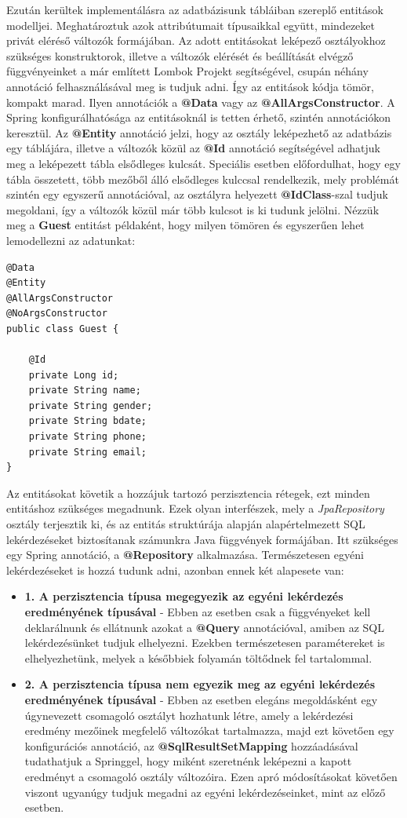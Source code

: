 \documentclass[12pt]{article}
\begin{document}
Ezután kerültek implementálásra az adatbázisunk tábláiban szereplő entitások modelljei. Meghatároztuk azok attribútumait típusaikkal együtt, mindezeket privát eléréső változók formájában. Az adott entitásokat leképező osztályokhoz szükséges konstruktorok, illetve a változók elérését és beállítását elvégző függvényeinket a már említett Lombok Projekt segítségével, csupán néhány annotáció felhasználásával meg is tudjuk adni. Így az entitások kódja tömör, kompakt marad. Ilyen annotációk a \textbf{@Data} vagy az \textbf{@AllArgsConstructor}. A Spring konfigurálhatósága az entitásoknál is tetten érhető, szintén annotációkon keresztül. Az \textbf{@Entity} annotáció jelzi, hogy az osztály leképezhető az adatbázis egy táblájára, illetve a változók közül az \textbf{@Id} annotáció segítségével adhatjuk meg a leképezett tábla elsődleges kulcsát. Speciális esetben előfordulhat, hogy egy tábla összetett, több mezőből álló elsődleges kulccsal rendelkezik, mely problémát szintén egy egyszerű annotációval, az osztályra helyezett \textbf{@IdClass}-szal tudjuk megoldani, így a változók közül már több kulcsot is ki tudunk jelölni. Nézzük meg a \textbf{Guest} entitást példaként, hogy milyen tömören és egyszerűen lehet lemodellezni az adatunkat:
\begin{verbatim}
@Data
@Entity
@AllArgsConstructor
@NoArgsConstructor
public class Guest {

    @Id
    private Long id;
    private String name;
    private String gender;
    private String bdate;
    private String phone;
    private String email;
}
\end{verbatim}

Az entitásokat követik a hozzájuk tartozó perzisztencia rétegek, ezt minden entitáshoz szükséges megadnunk. Ezek olyan interfészek, mely a \textit{JpaRepository} osztály terjesztik ki, és az entitás struktúrája alapján alapértelmezett SQL lekérdezéseket biztosítanak számunkra Java függvények formájában.  Itt szükséges egy Spring annotáció, a \textbf{@Repository} alkalmazása. Természetesen egyéni lekérdezéseket is hozzá tudunk adni, azonban ennek két alapesete van:
\begin{itemize}
	\item[]\textbf{1. A perzisztencia típusa megegyezik az egyéni lekérdezés eredményének típusával}
	- Ebben az esetben csak a függvényeket kell deklarálnunk és ellátnunk azokat a \textbf{@Query} annotációval, amiben az SQL lekérdezésünket tudjuk elhelyezni. Ezekben természetesen paramétereket is elhelyezhetünk, melyek a későbbiek folyamán töltődnek fel tartalommal.
	\item[]\textbf{2. A perzisztencia típusa nem egyezik meg az egyéni lekérdezés eredményének típusával}
	- Ebben az esetben elegáns megoldásként egy úgynevezett csomagoló osztályt hozhatunk létre, amely a lekérdezési eredmény mezőinek megfelelő változókat tartalmazza, majd ezt követően egy konfigurációs annotáció, az \textbf{@SqlResultSetMapping} hozzáadásával tudathatjuk a Springgel, hogy miként szeretnénk leképezni a kapott eredményt a csomagoló osztály változóira. Ezen apró módosításokat követően viszont ugyanúgy tudjuk megadni az egyéni lekérdezéseinket, mint az előző esetben.
\end{itemize}
\end{document}
